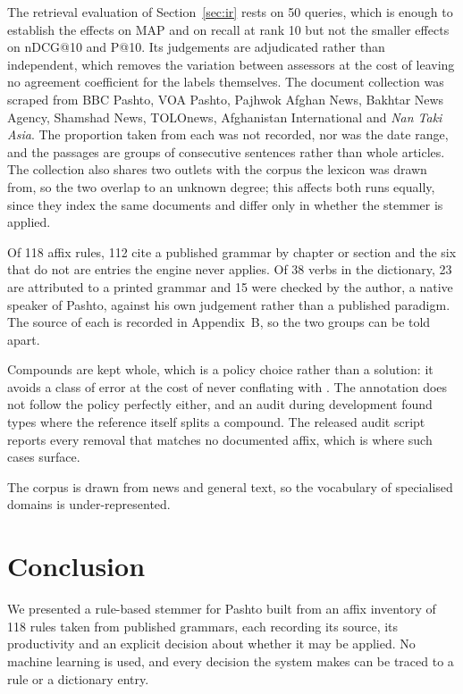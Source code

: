 \documentclass[conference]{IEEEtran}
\newcommand{\ps}[1]{{\pashtofont\textpashto{#1}}}
\begin{document}
The retrieval evaluation of Section~\ref{sec:ir} rests on 50 queries, which is
enough to establish the effects on MAP and on recall at rank 10 but not the
smaller effects on nDCG@10 and P@10. Its judgements are adjudicated rather than
independent, which removes the variation between assessors at the cost of
leaving no agreement coefficient for the labels themselves. The document collection was scraped from
BBC Pashto, VOA Pashto, Pajhwok Afghan News, Bakhtar News Agency, Shamshad
News, TOLOnews, Afghanistan International and \emph{Nan Taki Asia}. The
proportion taken
from each was not recorded, nor was the date range, and the passages are groups
of consecutive sentences rather than whole articles. The collection also shares
two outlets with the corpus the lexicon was drawn from, so the two overlap to
an unknown degree; this affects both runs equally, since they index the same
documents and differ only in whether the stemmer is applied.

Of 118 affix rules, 112 cite a published grammar by chapter or section and the
six that do not are entries the engine never applies. Of 38 verbs in the
dictionary, 23 are attributed to a printed grammar and 15 were checked by the
author, a native speaker of Pashto, against his own judgement rather than a
published paradigm. The source of each is recorded in Appendix~B, so the two
groups can be told apart.

Compounds are kept whole, which is a policy choice rather than a solution: it
avoids a class of error at the cost of never conflating \ps{لاسلیک} with
\ps{لاس}. The annotation does not follow the policy perfectly either, and an
audit during development found types where the reference itself splits a
compound. The released audit script
reports every removal that matches no documented affix, which is where such
cases surface.

The corpus is drawn from news and general text, so the vocabulary of
specialised domains is under-represented.

\section{Conclusion}

We presented a rule-based stemmer for Pashto built from an affix inventory of
118 rules taken from published grammars, each recording its source, its
productivity and an explicit decision about whether it may be applied. No
machine learning is used, and every decision the system makes can be traced to
a rule or a dictionary entry.
\end{document}

